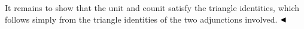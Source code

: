  
 
It remains to show that the unit and counit satisfy the triangle identities, which follows simply from the triangle identities of the two adjunctions involved. $\hfill\blacktriangleleft$\par
 
 
 
\par
 
 
 
